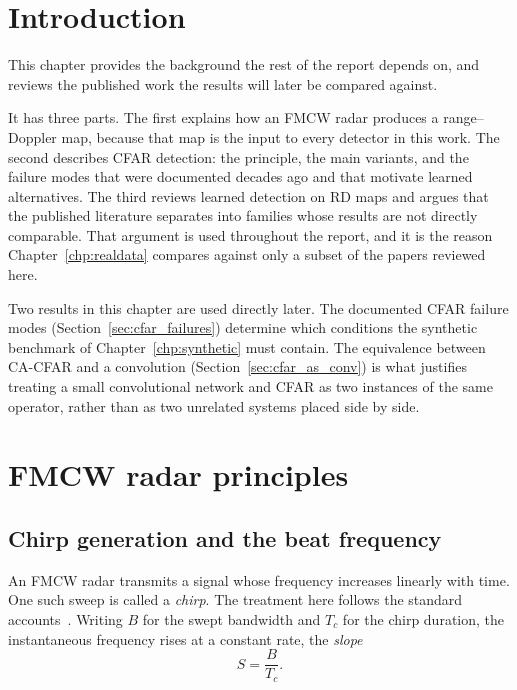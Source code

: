 
\section{Introduction}

This chapter provides the background the rest of the report depends on, and reviews the published
work the results will later be compared against.

It has three parts. The first explains how an FMCW radar produces a range--Doppler map, because
that map is the input to every detector in this work. The second describes CFAR detection: the
principle, the main variants, and the failure modes that were documented decades ago and that
motivate learned alternatives. The third reviews learned detection on RD maps and argues that the
published literature separates into families whose results are not directly comparable. That
argument is used throughout the report, and it is the reason Chapter~\ref{chp:realdata} compares
against only a subset of the papers reviewed here.

Two results in this chapter are used directly later. The documented CFAR failure modes
(Section~\ref{sec:cfar_failures}) determine which conditions the synthetic benchmark of
Chapter~\ref{chp:synthetic} must contain. The equivalence between CA-CFAR and a convolution
(Section~\ref{sec:cfar_as_conv}) is what justifies treating a small convolutional network and CFAR
as two instances of the same operator, rather than as two unrelated systems placed side by side.

\section{FMCW radar principles}

\subsection{Chirp generation and the beat frequency}

An FMCW radar transmits a signal whose frequency increases linearly with time. One such sweep is
called a \emph{chirp}. The treatment here follows the standard
accounts~\cite{skolnik2001radar,richards2014radar}. Writing $B$ for the swept bandwidth and $T_c$ for the chirp duration, the
instantaneous frequency rises at a constant rate, the \emph{slope}
\begin{equation}
S = \frac{B}{T_c}.
\end{equation}

